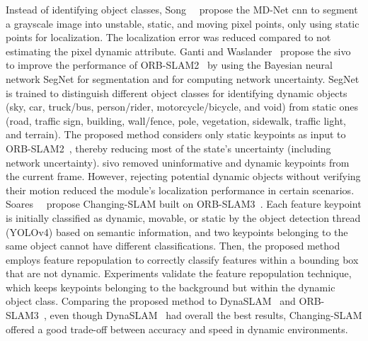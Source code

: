 Instead of identifying object classes, Song~\etal~\cite{song:iros:2019}
propose the MD-Net \gls{cnn} to segment a grayscale image into
unstable, static, and moving pixel points,
only using static points for localization.
The localization error was reduced compared to
not estimating the pixel dynamic attribute.
Ganti and Waslander~\cite{ganti-waslander:crv:2019} propose the \gls{sivo}
to improve the performance of ORB-SLAM2~\cite{mur-artal-tardos:tro:2017}
by using the Bayesian neural network SegNet for
segmentation and for computing network uncertainty.
SegNet is trained to distinguish different object classes
for identifying dynamic objects
(sky, car, truck/bus, person/rider, motorcycle/bicycle, and void)
from static ones
(road, traffic sign, building, wall/fence, pole, vegetation, sidewalk,
traffic light, and terrain).
The proposed method considers only static keypoints as input to
ORB-SLAM2~\cite{mur-artal-tardos:tro:2017}, thereby reducing most of
the state's uncertainty (including network uncertainty).
\gls{sivo} removed uninformative and dynamic keypoints from the current frame.
However, rejecting potential dynamic objects without verifying
their motion reduced the module's localization performance in certain scenarios.
Soares~\etal~\cite{soares:jint:2023} propose Changing-SLAM built on
ORB-SLAM3~\cite{campos:tro:2021}. Each feature keypoint
is initially classified as dynamic, movable, or static
by the object detection thread (YOLOv4) based on semantic information,
and two keypoints belonging to the same object
cannot have different classifications.
Then, the proposed method employs feature repopulation
to correctly classify features within a bounding box that are not dynamic.
Experiments validate the feature repopulation technique,
which keeps keypoints belonging to the background
but within the dynamic object class.
Comparing the proposed method to DynaSLAM~\cite{bescos:ral:2018} and
ORB-SLAM3~\cite{campos:tro:2021}, even though DynaSLAM~\cite{bescos:ral:2018}
had overall the best results, Changing-SLAM offered a good trade-off
between accuracy and speed in dynamic environments.

